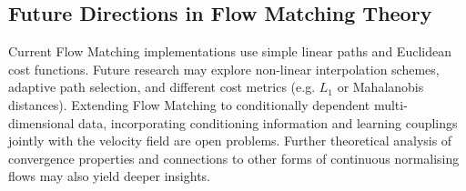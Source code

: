 \subsection{Future Directions in Flow Matching Theory}

Current Flow Matching implementations use simple linear paths and
Euclidean cost functions.  Future research may explore non-linear
interpolation schemes, adaptive path selection, and different cost
metrics (e.g. \(L_1\) or Mahalanobis distances).  Extending Flow
Matching to conditionally dependent multi-dimensional data,
incorporating conditioning information and learning couplings jointly
with the velocity field are open problems.  Further theoretical
analysis of convergence properties and connections to other forms of
continuous normalising flows may also yield deeper insights.

